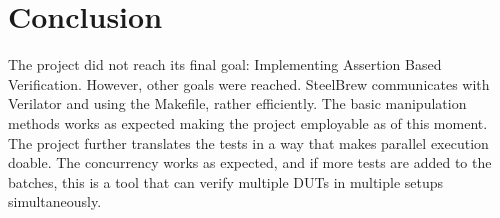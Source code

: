 \section{Conclusion}\label{sec:08}
The project did not reach its final goal: Implementing Assertion Based Verification.\newline
However, other goals were reached. SteelBrew communicates with Verilator and using the Makefile, rather efficiently. The basic manipulation methods works as expected making the project employable as of this moment. The project further translates the tests in a way that makes parallel execution doable. The concurrency works as expected, and if more tests are added to the batches, this is a tool that can verify multiple DUTs in multiple setups simultaneously.